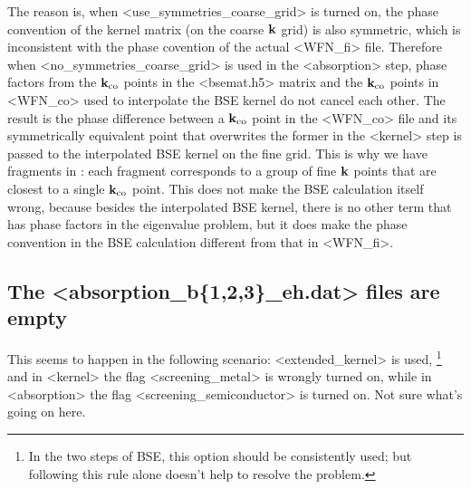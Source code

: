 \documentclass[hyperref, a4paper, 12pt]{report}
\def\texttt#1{<#1>}%
\newcommand{\shortcode}[1]{\texttt{#1}}
\begin{document}
The reason is, when \shortcode{use_symmetries_coarse_grid} is turned on,
the phase convention of the kernel matrix (on the coarse $\vb{k}$ grid) is also symmetric,
which is inconsistent with the phase covention of the actual \shortcode{WFN_fi} file.
Therefore when \shortcode{no_symmetries_coarse_grid} is used in the \shortcode{absorption} step,
phase factors from the $\vb{k}_{\text{co}}$ points in the \shortcode{bsemat.h5} matrix 
and the $\vb{k}_{\text{co}}$ points in \shortcode{WFN_co} used to interpolate the BSE kernel 
do not cancel each other.
The result is the phase difference between a $\vb{k}_{\text{co}}$ point in the \shortcode{WFN_co} file and its symmetrically equivalent point that overwrites the former in the \shortcode{kernel} step is passed to the interpolated BSE kernel on the fine grid.
This is why we have fragments in :
each fragment corresponds to a group of fine $\vb{k}$ points that are closest to a single $\vb{k}_{\text{co}}$ point.
This does not make the BSE calculation itself wrong,
because besides the interpolated BSE kernel, there is no other term that has phase factors in the eigenvalue problem,
but it does make the phase convention in the BSE calculation different from that in \shortcode{WFN_fi}.

\subsection{The \shortcode{absorption_b\{1,2,3\}_eh.dat} files are empty}

This seems to happen in the following scenario: 
\shortcode{extended_kernel} is used,%
\footnote{
    In the two steps of BSE, this option should be consistently used; 
    but following this rule alone doesn't help to resolve the problem.
}
and in \shortcode{kernel} the flag \shortcode{screening_metal} is wrongly turned on, 
while in \shortcode{absorption} the flag \shortcode{screening_semiconductor} is turned on.
Not sure what's going on here.



\end{document}
